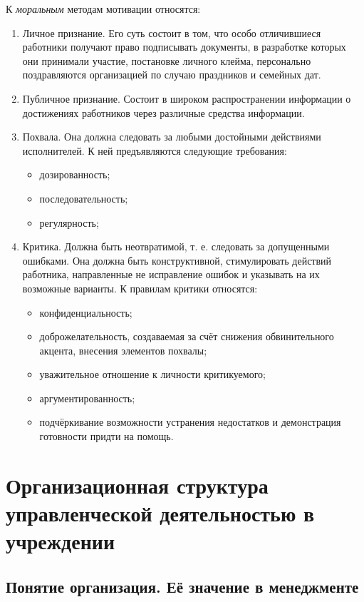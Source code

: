 \documentclass[12pt, russian, oneside, article]{ncc}
\begin{document}
К \emph{моральным} методам мотивации относятся:
\begin{enumerate}
\item Личное признание. Его суть состоит в том, что особо отличившиеся работники получают право подписывать документы, в разработке которых они принимали участие, постановке личного клейма, персонально поздравляются организацией по случаю праздников и семейных дат.
\item Публичное признание. Состоит в широком распространении информации о достижениях работников через различные средства информации.
\item Похвала. Она должна следовать за любыми достойными действиями исполнителей. К ней предъявляются следующие требования:

\begin{itemize}
\item дозированность;
\item последовательность;
\item регулярность;
\end{itemize}

\item Критика. Должна быть неотвратимой, т. е. следовать за допущенными ошибками. Она должна быть конструктивной, стимулировать действий работника, направленные не исправление ошибок и указывать на их возможные варианты. К правилам критики относятся:

\begin{itemize}
\item конфиденциальность;
\item доброжелательность, создаваемая за счёт снижения обвинительного акцента, внесения элементов похвалы;
\item уважительное отношение к личности критикуемого;
\item аргументированность;
\item подчёркивание возможности устранения недостатков и демонстрация готовности придти на помощь.
\end{itemize}

\end{enumerate}
\section{Организационная структура управленческой деятельностью в учреждении}
\label{sec-5}
\subsection{Понятие организация. Её значение в менеджменте}
\label{sec-5_1}
\end{document}
